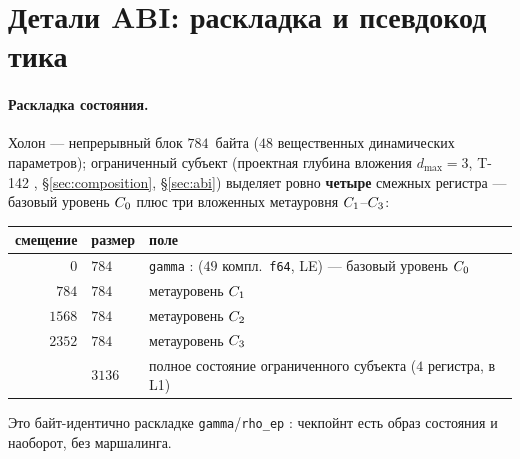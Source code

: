 \section{Детали ABI: раскладка и псевдокод тика}
\label{app:abi}

\paragraph{Раскладка состояния.} Холон --- непрерывный блок $784$~байта ($48$
вещественных динамических параметров); ограниченный субъект (проектная глубина
вложения $d_{\max}=3$, T-142 , \S\ref{sec:composition},
\S\ref{sec:abi}) выделяет ровно \textbf{четыре} смежных регистра \DM{} ---
базовый уровень $C_0$ плюс три вложенных метауровня $C_1$--$C_3$:
\begin{center}\small
\begin{tabular}{@{}rll@{}}
\toprule
смещение & размер & поле \\
\midrule
$0$    & $784$ & \texttt{gamma} : \DM{} ($49$ компл.\ \texttt{f64}, LE) --- базовый уровень $C_0$ \\
$784$  & $784$ & метауровень $C_1$ \DM{} \\
$1568$ & $784$ & метауровень $C_2$ \DM{} \\
$2352$ & $784$ & метауровень $C_3$ \DM{} \\
\midrule
       & $3136$ & полное состояние ограниченного субъекта ($4$ регистра, в L1) \\
\bottomrule
\end{tabular}
\end{center}
Это байт-идентично раскладке \texttt{gamma}/\texttt{rho\_ep} \SYNARC{}:
чекпойнт \SYNARC{} есть образ состояния \TALOS{} и наоборот, без маршалинга.

